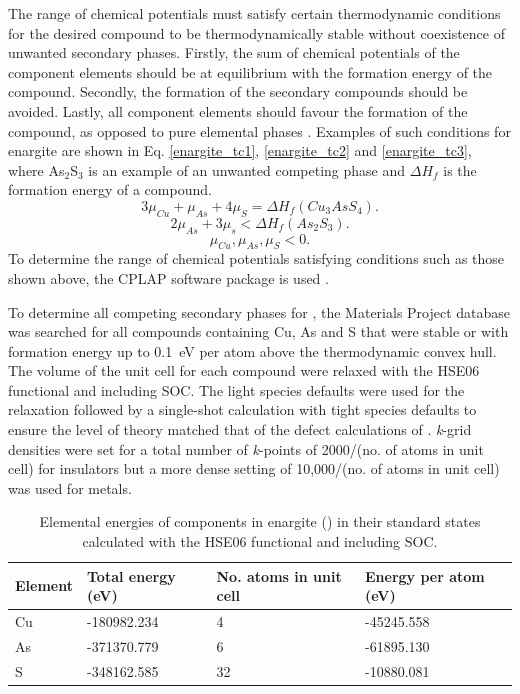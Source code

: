 \documentclass[11pt, twoside]{report}
\begin{document}
The range of chemical potentials must satisfy certain thermodynamic conditions for the desired compound to be thermodynamically stable without coexistence of unwanted secondary phases. Firstly, the sum of chemical potentials of the component elements should be at equilibrium with the formation energy of the compound. Secondly, the formation of the secondary compounds should be avoided. Lastly, all component elements should favour the formation of the compound, as opposed to pure elemental phases \cite{defects_Chen}. Examples of such conditions for enargite are shown in Eq. \ref{enargite_tc1}, \ref{enargite_tc2} and \ref{enargite_tc3}, where As$_2$S$_3$ is an example of an unwanted competing phase and $\Delta H_f$ is the formation energy of a compound.
\begin{equation}\label{enargite_tc1}
3\mu_{Cu} + \mu_{As} + 4\mu_{S} = \Delta H_f(Cu_3AsS_4) .    
\end{equation}
\begin{equation}\label{enargite_tc2}
2\mu_{As} + 3\mu_{s} < \Delta H_f(As_2S_3) .
\end{equation}
\begin{equation}\label{enargite_tc3}
\mu_{Cu}, \mu_{As}, \mu_{S} < 0 .    
\end{equation}
To determine the range of chemical potentials satisfying conditions such as those shown above, the CPLAP software package is used \cite{cplap}. 

To determine all competing secondary phases for {\enargite}, the Materials Project \cite{materials_project} database was searched for all compounds containing Cu, As and S that were stable or with formation energy up to \SI{0.1}{eV} per atom above the thermodynamic convex hull. The volume of the unit cell for each compound were relaxed with the HSE06 functional and including SOC. The light species defaults were used for the relaxation followed by a single-shot calculation with tight species defaults to ensure the level of theory matched that of the defect calculations of {\enargite}. \textit{k}-grid densities were set for a total number of \textit{k}-points of 2000/(no. of atoms in unit cell) for insulators but a more dense setting of 10,000/(no. of atoms in unit cell) was used for metals.

\begin{table}[h!]
\begin{tabular}{@{}llll@{}}
\toprule
Element & Total energy (eV) & No. atoms in unit cell & Energy per atom (eV)      \\ \midrule
Cu      & -180982.234      & 4                      & -45245.558 \\
As      & -371370.779      & 6                      & -61895.130 \\
S       & -348162.585       & 32                     & -10880.081 \\ \bottomrule
\end{tabular}
\caption{Elemental energies of components in enargite ({\enargite}) in their standard states calculated with the HSE06 functional and including SOC.}\label{enargite_elements}
\end{table}
\end{document}
